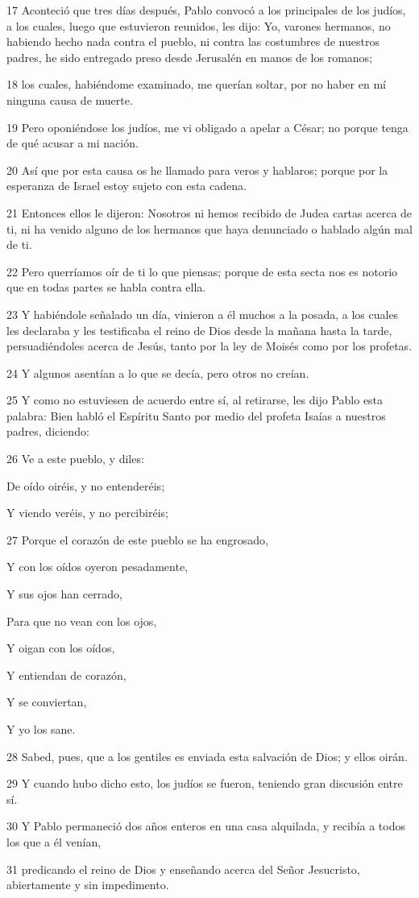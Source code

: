 \par 17 Aconteció que tres días después, Pablo convocó a los principales de los judíos, a los cuales, luego que estuvieron reunidos, les dijo: Yo, varones hermanos, no habiendo hecho nada contra el pueblo, ni contra las costumbres de nuestros padres, he sido entregado preso desde Jerusalén en manos de los romanos;
\par 18 los cuales, habiéndome examinado, me querían soltar, por no haber en mí ninguna causa de muerte.
\par 19 Pero oponiéndose los judíos, me vi obligado a apelar a César; no porque tenga de qué acusar a mi nación.
\par 20 Así que por esta causa os he llamado para veros y hablaros; porque por la esperanza de Israel estoy sujeto con esta cadena.
\par 21 Entonces ellos le dijeron: Nosotros ni hemos recibido de Judea cartas acerca de ti, ni ha venido alguno de los hermanos que haya denunciado o hablado algún mal de ti.
\par 22 Pero querríamos oír de ti lo que piensas; porque de esta secta nos es notorio que en todas partes se habla contra ella.
\par 23 Y habiéndole señalado un día, vinieron a él muchos a la posada, a los cuales les declaraba y les testificaba el reino de Dios desde la mañana hasta la tarde, persuadiéndoles acerca de Jesús, tanto por la ley de Moisés como por los profetas.
\par 24 Y algunos asentían a lo que se decía, pero otros no creían.
\par 25 Y como no estuviesen de acuerdo entre sí, al retirarse, les dijo Pablo esta palabra: Bien habló el Espíritu Santo por medio del profeta Isaías a nuestros padres, diciendo:
\par 26 Ve a este pueblo, y diles:
\par De oído oiréis, y no entenderéis;
\par Y viendo veréis, y no percibiréis;
\par 27 Porque el corazón de este pueblo se ha engrosado,
\par Y con los oídos oyeron pesadamente,
\par Y sus ojos han cerrado,
\par Para que no vean con los ojos,
\par Y oigan con los oídos,
\par Y entiendan de corazón,
\par Y se conviertan,
\par Y yo los sane.
\par 28 Sabed, pues, que a los gentiles es enviada esta salvación de Dios; y ellos oirán.
\par 29 Y cuando hubo dicho esto, los judíos se fueron, teniendo gran discusión entre sí.
\par 30 Y Pablo permaneció dos años enteros en una casa alquilada, y recibía a todos los que a él venían,
\par 31 predicando el reino de Dios y enseñando acerca del Señor Jesucristo, abiertamente y sin impedimento.

